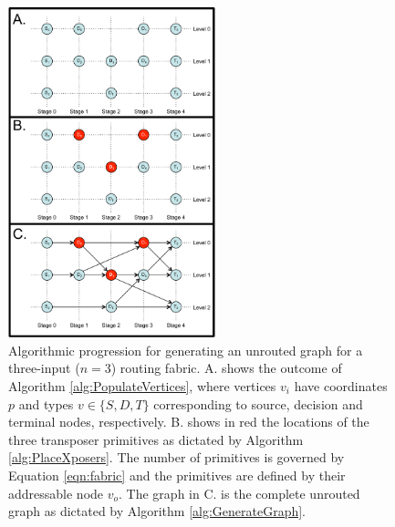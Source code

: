 \begin{figure}[h]
     \begin{minipage}[t]{0.99\linewidth}\centering
      \includegraphics[width=6cm]{fig5.pdf}
      \medskip
     \end{minipage}\hfill
     \caption[Transposer routing algorithmic progression]{Algorithmic progression for generating an unrouted graph for a three-input ($n=3$) routing fabric. A. shows the outcome of Algorithm \ref{alg:PopulateVertices}, where vertices $v_i$ have coordinates $p$ and types $v\in\{S,D,T\}$ corresponding to source, decision and terminal nodes, respectively. B. shows in red the locations of the three transposer primitives as dictated by Algorithm \ref{alg:PlaceXposers}. The number of primitives is governed by Equation \ref{eqn:fabric} and the primitives are defined by their addressable node $v_o$. The graph in C. is the complete unrouted graph as dictated by Algorithm \ref{alg:GenerateGraph}.}
	\label{fig:algProgression}
\end{figure}

